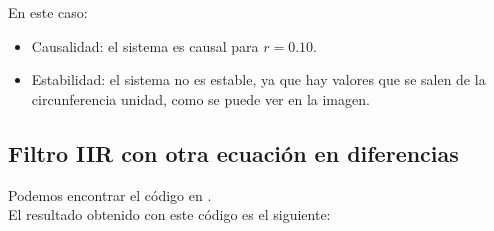\documentclass[11pt,a4paper]{article}
\begin{document}
En este caso:

\begin{itemize}
	\item Causalidad: el sistema es causal para $r=0.10$.
	\item Estabilidad: el sistema no es estable, ya que hay valores que se salen de la circunferencia unidad, como se puede ver en la imagen.
\end{itemize}

\subsection{Filtro IIR con otra ecuación en diferencias}

Podemos encontrar el código en \color{deepred}\color{black}.\\

El resultado obtenido con este código es el siguiente:
\end{document}
